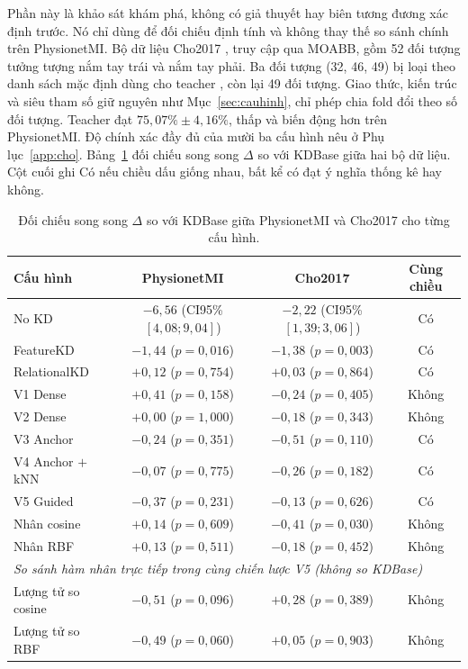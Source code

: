 Phần này là khảo sát khám phá, không có giả thuyết hay biên tương đương xác
định trước. Nó chỉ dùng để đối chiếu định tính và không thay thế so sánh
chính trên PhysionetMI. Bộ dữ liệu Cho2017 \cite{cho2017eeg}, truy cập qua
MOABB, gồm 52 đối tượng tưởng tượng nắm tay trái và nắm tay phải. Ba đối
tượng (32, 46, 49) bị loại theo danh sách mặc định dùng cho teacher
\cite{zoumpourlis2024motor}, còn lại 49 đối tượng. Giao thức, kiến trúc và
siêu tham số giữ nguyên như Mục~\ref{sec:cauhinh}, chỉ phép chia fold đổi
theo số đối tượng. Teacher đạt $75{,}07\% \pm 4{,}16\%$, thấp và biến động
hơn trên PhysionetMI. Độ chính xác đầy đủ của mười ba cấu hình nêu ở
Phụ lục~\ref{app:cho}. Bảng~\ref{tab:sosanh2dataset} đối chiếu song song
$\Delta$ so với KDBase giữa hai bộ dữ liệu. Cột cuối ghi Có nếu chiều dấu
giống nhau, bất kể có đạt ý nghĩa thống kê hay không.

\begin{table}[!htbp]
\centering
\caption{Đối chiếu song song $\Delta$ so với KDBase giữa PhysionetMI và
Cho2017 cho từng cấu hình.}
\label{tab:sosanh2dataset}
\small
\begin{tabular}{lccc}
\toprule
\textbf{Cấu hình} & \textbf{PhysionetMI} & \textbf{Cho2017} & \textbf{Cùng chiều} \\
\midrule
No KD & $-6{,}56$ (CI95\% $[4{,}08;9{,}04]$) & $-2{,}22$ (CI95\% $[1{,}39;3{,}06]$) & Có \\
FeatureKD & $-1{,}44$ ($p=0{,}016$) & $-1{,}38$ ($p=0{,}003$) & Có \\
RelationalKD & $+0{,}12$ ($p=0{,}754$) & $+0{,}03$ ($p=0{,}864$) & Có \\
V1 Dense & $+0{,}41$ ($p=0{,}158$) & $-0{,}24$ ($p=0{,}405$) & Không \\
V2 Dense & $+0{,}00$ ($p=1{,}000$) & $-0{,}18$ ($p=0{,}343$) & Không \\
V3 Anchor & $-0{,}24$ ($p=0{,}351$) & $-0{,}51$ ($p=0{,}110$) & Có \\
V4 Anchor $+$ kNN & $-0{,}07$ ($p=0{,}775$) & $-0{,}26$ ($p=0{,}182$) & Có \\
V5 Guided & $-0{,}37$ ($p=0{,}231$) & $-0{,}13$ ($p=0{,}626$) & Có \\
Nhân cosine & $+0{,}14$ ($p=0{,}609$) & $-0{,}41$ ($p=0{,}030$) & Không \\
Nhân RBF & $+0{,}13$ ($p=0{,}511$) & $-0{,}18$ ($p=0{,}452$) & Không \\
\midrule
\multicolumn{4}{l}{\textit{So sánh hàm nhân trực tiếp trong cùng chiến lược V5 (không so KDBase)}} \\
Lượng tử so cosine & $-0{,}51$ ($p=0{,}096$) & $+0{,}28$ ($p=0{,}389$) & Không \\
Lượng tử so RBF & $-0{,}49$ ($p=0{,}060$) & $+0{,}05$ ($p=0{,}903$) & Không \\
\bottomrule
\end{tabular}
\end{table}
\FloatBarrier

